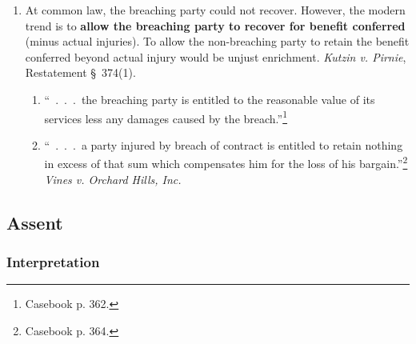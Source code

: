 \begin{enumerate}
\begin{enumerate}
    \end{enumerate}
    \item At common law, the breaching party could not recover. However, the 
    modern trend is to \textbf{allow the breaching party to recover for benefit 
    conferred} (minus actual injuries). To allow the non-breaching party to 
    retain the benefit conferred beyond actual injury would be unjust 
    enrichment. \emph{Kutzin v. Pirnie}, Restatement \S\ 374(1).
    \begin{enumerate}
        \item ``~.~.~.~the breaching party is entitled to the reasonable value 
        of its services less any damages caused by the 
        breach.''\footnote{Casebook p. 362.}
        \item ``~.~.~.~a party injured by breach of contract is entitled to 
        retain nothing in excess of that sum which compensates him for the 
        loss of his bargain.''\footnote{Casebook p. 364.} \emph{Vines v. 
        Orchard Hills, Inc.}
    \end{enumerate}
\end{enumerate}

\subsection{Assent}

\subsubsection{Interpretation}

